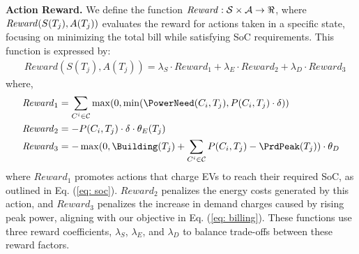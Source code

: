 {\bf Action Reward.} We define the function ${\it Reward}: \mathcal{S} \times \mathcal{A} \rightarrow \Re$, where ${\it Reward}(S(T_j), A(T_j))$ evaluates the reward for actions taken in a specific state, focusing on minimizing the total bill while satisfying SoC requirements. This function is expressed by: 
\begin{align}
   & \mathit{Reward}(S(T_j), A(T_j)) = \lambda_{S} \cdot \mathit{Reward}_1 + \lambda_{E} \cdot \mathit{Reward}_2 + \lambda_{D} \cdot \mathit{Reward}_3
\end{align}
where, 
\begin{align*}
\begin{aligned}
    \mathit{Reward}_1 &=  \sum\limits_{C^i\in\mathcal{C}} \max(0, \min(\PowerNeed(C_i, T_j), P(C_i, T_j) \cdot \delta)) \\
    \mathit{Reward}_2 &= - P(C_i, T_j) \cdot \delta  \cdot \theta_E(T_j) \\
    \mathit{Reward}_3 &= - \max(0, \Building(T_j) + \sum\limits_{C^i \in \mathcal{C}} P(C_i, T_j) - \PrdPeak(T_j)) \cdot \theta_D
\end{aligned}
\end{align*}
where $\mathit{Reward}_1$ promotes actions that charge EVs to reach their required SoC, as outlined in Eq. (\ref{eq: soc}). $\mathit{Reward}_2$ penalizes the energy costs generated by this action, and $\mathit{Reward}_3$ penalizes the increase in demand charges caused by rising peak power, aligning with our objective in Eq. (\ref{eq: billing}). These functions use three reward coefficients, $\lambda_{S}$, $\lambda_{E}$, and $\lambda_{D}$ to balance trade-offs between these reward factors. 

 
